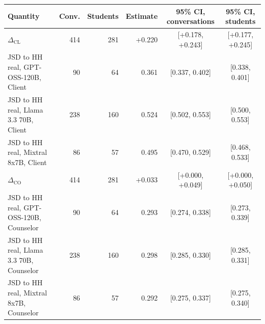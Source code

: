\begin{tabular}{lrrrcc}
\toprule
Quantity & Conv. & Students & Estimate & 95\% CI, conversations & 95\% CI, students \\
\midrule
$\Delta_{\mathrm{CL}}$ & 414 & 281 & +0.220 & [+0.178, +0.243] & [+0.177, +0.245] \\
JSD to HH real, GPT-OSS-120B, Client & 90 & 64 & 0.361 & [0.337, 0.402] & [0.338, 0.401] \\
JSD to HH real, Llama 3.3 70B, Client & 238 & 160 & 0.524 & [0.502, 0.553] & [0.500, 0.553] \\
JSD to HH real, Mixtral 8x7B, Client & 86 & 57 & 0.495 & [0.470, 0.529] & [0.468, 0.533] \\
$\Delta_{\mathrm{CO}}$ & 414 & 281 & +0.033 & [+0.000, +0.049] & [+0.000, +0.050] \\
JSD to HH real, GPT-OSS-120B, Counselor & 90 & 64 & 0.293 & [0.274, 0.338] & [0.273, 0.339] \\
JSD to HH real, Llama 3.3 70B, Counselor & 238 & 160 & 0.298 & [0.285, 0.330] & [0.285, 0.331] \\
JSD to HH real, Mixtral 8x7B, Counselor & 86 & 57 & 0.292 & [0.275, 0.337] & [0.275, 0.340] \\
\bottomrule
\end{tabular}
